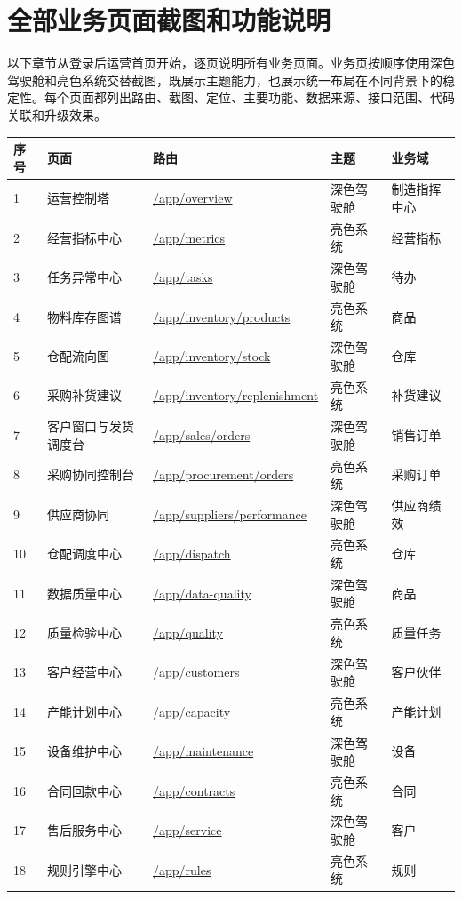 \documentclass[UTF8,zihao=-4]{ctexart}
\newcommand{\code}[1]{{\small\url{#1}}}
\begin{document}
\section{全部业务页面截图和功能说明}
以下章节从登录后运营首页开始，逐页说明所有业务页面。业务页按顺序使用深色驾驶舱和亮色系统交替截图，既展示主题能力，也展示统一布局在不同背景下的稳定性。每个页面都列出路由、截图、定位、主要功能、数据来源、接口范围、代码关联和升级效果。
\begin{longtable}{p{}p{}p{}p{}p{}}
\toprule
序号 & 页面 & 路由 & 主题 & 业务域 \\
\midrule
\endhead
1 & 运营控制塔 & \code{/app/overview} & 深色驾驶舱 & 制造指挥中心 \\
2 & 经营指标中心 & \code{/app/metrics} & 亮色系统 & 经营指标 \\
3 & 任务异常中心 & \code{/app/tasks} & 深色驾驶舱 & 待办 \\
4 & 物料库存图谱 & \code{/app/inventory/products} & 亮色系统 & 商品 \\
5 & 仓配流向图 & \code{/app/inventory/stock} & 深色驾驶舱 & 仓库 \\
6 & 采购补货建议 & \code{/app/inventory/replenishment} & 亮色系统 & 补货建议 \\
7 & 客户窗口与发货调度台 & \code{/app/sales/orders} & 深色驾驶舱 & 销售订单 \\
8 & 采购协同控制台 & \code{/app/procurement/orders} & 亮色系统 & 采购订单 \\
9 & 供应商协同 & \code{/app/suppliers/performance} & 深色驾驶舱 & 供应商绩效 \\
10 & 仓配调度中心 & \code{/app/dispatch} & 亮色系统 & 仓库 \\
11 & 数据质量中心 & \code{/app/data-quality} & 深色驾驶舱 & 商品 \\
12 & 质量检验中心 & \code{/app/quality} & 亮色系统 & 质量任务 \\
13 & 客户经营中心 & \code{/app/customers} & 深色驾驶舱 & 客户伙伴 \\
14 & 产能计划中心 & \code{/app/capacity} & 亮色系统 & 产能计划 \\
15 & 设备维护中心 & \code{/app/maintenance} & 深色驾驶舱 & 设备 \\
16 & 合同回款中心 & \code{/app/contracts} & 亮色系统 & 合同 \\
17 & 售后服务中心 & \code{/app/service} & 深色驾驶舱 & 客户 \\
18 & 规则引擎中心 & \code{/app/rules} & 亮色系统 & 规则 \\

\end{longtable}
\end{document}
